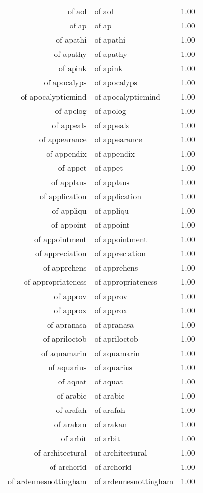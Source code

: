 \begin{table}[ht]
\begin{tabular}{rlr}
  of aol & of aol & 1.00 \\ 
  of ap & of ap & 1.00 \\ 
  of apathi & of apathi & 1.00 \\ 
  of apathy & of apathy & 1.00 \\ 
  of apink & of apink & 1.00 \\ 
  of apocalyps & of apocalyps & 1.00 \\ 
  of apocalypticmind & of apocalypticmind & 1.00 \\ 
  of apolog & of apolog & 1.00 \\ 
  of appeals & of appeals & 1.00 \\ 
  of appearance & of appearance & 1.00 \\ 
  of appendix & of appendix & 1.00 \\ 
  of appet & of appet & 1.00 \\ 
  of applaus & of applaus & 1.00 \\ 
  of application & of application & 1.00 \\ 
  of appliqu & of appliqu & 1.00 \\ 
  of appoint & of appoint & 1.00 \\ 
  of appointment & of appointment & 1.00 \\ 
  of appreciation & of appreciation & 1.00 \\ 
  of apprehens & of apprehens & 1.00 \\ 
  of appropriateness & of appropriateness & 1.00 \\ 
  of approv & of approv & 1.00 \\ 
  of approx & of approx & 1.00 \\ 
  of apranasa & of apranasa & 1.00 \\ 
  of apriloctob & of apriloctob & 1.00 \\ 
  of aquamarin & of aquamarin & 1.00 \\ 
  of aquarius & of aquarius & 1.00 \\ 
  of aquat & of aquat & 1.00 \\ 
  of arabic & of arabic & 1.00 \\ 
  of arafah & of arafah & 1.00 \\ 
  of arakan & of arakan & 1.00 \\ 
  of arbit & of arbit & 1.00 \\ 
  of architectural & of architectural & 1.00 \\ 
  of archorid & of archorid & 1.00 \\ 
  of ardennesnottingham & of ardennesnottingham & 1.00 \\ 

\end{tabular}
\end{table}

